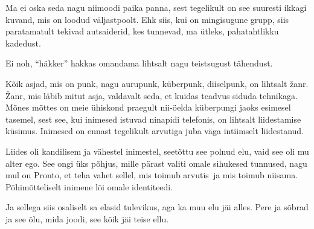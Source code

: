 
Ma ei oska seda nagu niimoodi paika panna, sest tegelikult on see suuresti 
ikkagi kuvand, mis on loodud väljastpoolt. Ehk siis, kui on mingisugune grupp, 
siis paratamatult tekivad  autsaiderid, kes tunnevad, ma ütleks, pahatahtlikku 
kadedust. 


Ei noh, \enquote{häkker} hakkas omandama lihtsalt nagu teistsugust tähendust.


Kõik asjad, mis on punk, nagu aurupunk, küberpunk, diiselpunk, on lihtsalt 
žanr. Žanr, mis läbib mitut asja, valdavalt seda, et kuidas teadvus siduda 
tehnikaga. Mõnes mõttes on meie ühiskond praegult nii-öelda küberpungi jaoks 
esimesel tasemel, sest see, kui inimesed istuvad ninapidi telefonis, on 
lihtsalt liidestamise küsimus. Inimesed on ennast tegelikult arvutiga juba väga 
intiimselt liidestanud.


Liides oli kandilisem ja vähestel inimestel, seetõttu see polnud elu, vaid see 
oli mu alter ego. See ongi üks põhjus, mille pärast valiti omale sihukesed 
tunnused, nagu mul on Pronto, et teha vahet sellel, mis toimub arvutis ja mis 
toimub niisama. Põhimõtteliselt inimene lõi omale identiteedi. 


Ja sellega siis osaliselt sa elasid tulevikus, aga ka muu elu jäi alles. Pere 
ja  sõbrad ja see õlu, mida joodi, see kõik jäi teise ellu.

